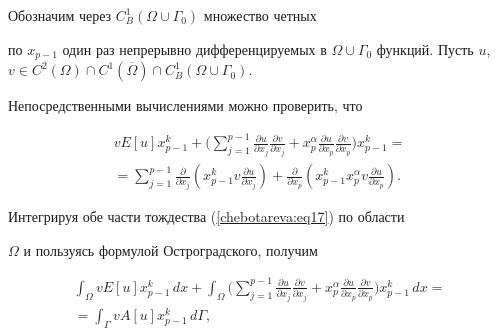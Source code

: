 

Обозначим через $C_B^1 (\Omega \cup \Gamma _0 )$ множество четных


по $x_{p - 1}$ один раз непрерывно дифференцируемых в $\Omega \cup


\Gamma _0$ функций. Пусть \linebreak $u$,  $v \in C^2\left( \Omega \right) \cap


C^1\left( {\overline \Omega } \right) \cap C_B^1 \left( {\Omega


\cup \Gamma _0 } \right)$.





Непосредственными вычислениями можно проверить,  что


\begin{multline}


\label{chebotareva:eq17} vE\left[ u \right]x_{p - 1}^k + \Biggl(


{\sum\limits_{j = 1}^{p - 1} {\frac{\partial u}{\partial x_j


}\frac{\partial v}{\partial x_j } + x_p^\alpha \frac{\partial


u}{\partial x_p }\frac{\partial v}{\partial x_p }} } \Biggr)x_{p -


1}^k = \\ = \sum\limits_{j = 1}^{p - 1} {\frac{\partial }{\partial x_j


}\left( {x_{p - 1}^k v\frac{\partial u}{\partial x_j }} \right) +


\frac{\partial }{\partial x_p }\left( {x_{p - 1}^k x_p^\alpha


v\frac{\partial u}{\partial x_p }} \right)} .


\end{multline}





Интегрируя обе части тождества (\ref{chebotareva:eq17}) по области


$\Omega $ и пользуясь формулой Остроградского,  получим


\begin{multline}


\label{chebotareva:eq18} \int_\Omega vE\left[ u


\right]x_{p - 1}^k \,dx + \int_\Omega \Biggl(


{\sum\limits_{j = 1}^{p - 1} {\frac{\partial u}{\partial x_j


}\frac{\partial v}{\partial x_j } + x_p^\alpha \frac{\partial


u}{\partial x_p }\frac{\partial v}{\partial x_p }} } \Biggr)x_{p -


1}^k \,dx = \\


= \int_\Gamma {vA\left[ u \right]} x_{p - 1}^k\,


d\Gamma , 


\end{multline}



